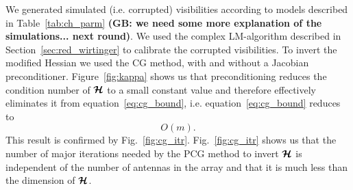 \documentclass[useAMS,usenatbib]{mn2e}
\newcommand{\bmH}{\bmath{\mathcal{H}}}
\begin{document}
We generated simulated (i.e. corrupted) visibilities according to models described in Table~\ref{tab:ch_parm} {\bf (GB: we need some more explanation of the simulations... next round)}. 
%
We used the complex LM-algorithm described in Section~\ref{sec:red_wirtinger} to calibrate the corrupted visibilities. To invert the modified
Hessian we used the CG method, with and without a Jacobian preconditioner. 
Figure~\ref{fig:kappa} shows us that preconditioning reduces the condition number of $\bmH$ to a small constant value and therefore effectively eliminates
it from equation~\ref{eq:cg_bound}, i.e. equation~\ref{eq:cg_bound} reduces to
\begin{equation}
\label{eq:cg_bound2}
O(m). 
\end{equation}
This result is confirmed by Fig.~\ref{fig:cg_itr}. Fig.~\ref{fig:cg_itr} 
shows us that the number of major iterations needed by the PCG method to invert 
$\bmH$ is independent of the number of antennas in the array and that it is much less than the 
dimension of $\bmH$. 
\end{document}
